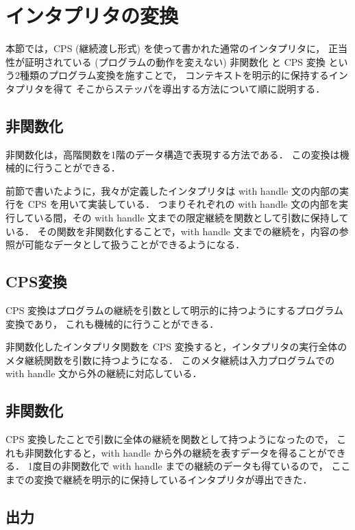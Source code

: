 \section{インタプリタの変換}
\label{section:transform}

本節では，CPS (継続渡し形式) を使って書かれた通常のインタプリタに，
正当性が証明されている (プログラムの動作を変えない)
非関数化 \cite{Reynolds1998} と CPS 変換 \cite{PLOTKIN1975125} という2種類のプログラム変換を施すことで，
コンテキストを明示的に保持するインタプリタを得て
そこからステッパを導出する方法について順に説明する．

\subsection{非関数化}
\label{subsection:defun}

非関数化は，高階関数を1階のデータ構造で表現する方法である．
この変換は機械的に行うことができる．

前節で書いたように，我々が定義したインタプリタは with handle 文の内部の実行を CPS を用いて実装している．
つまりそれぞれの with handle 文の内部を実行している間，その with handle 文までの限定継続を関数として引数に保持している．
その関数を非関数化することで，with handle 文までの継続を，内容の参照が可能なデータとして扱うことができるようになる．

\subsection{CPS変換}
\label{subsection:cps}

CPS 変換はプログラムの継続を引数として明示的に持つようにするプログラム変換であり，
これも機械的に行うことができる．

非関数化したインタプリタ関数を CPS 変換すると，インタプリタの実行全体のメタ継続関数を引数に持つようになる．
このメタ継続は入力プログラムでの with handle 文から外の継続に対応している．

\subsection{非関数化}
\label{subsection:defun2}

CPS 変換したことで引数に全体の継続を関数として持つようになったので，
これも非関数化すると，with handle から外の継続を表すデータを得ることができる．
1度目の非関数化で with handle までの継続のデータも得ているので，
ここまでの変換で継続を明示的に保持しているインタプリタが導出できた．

\subsection{出力}
\label{subsection:output}

